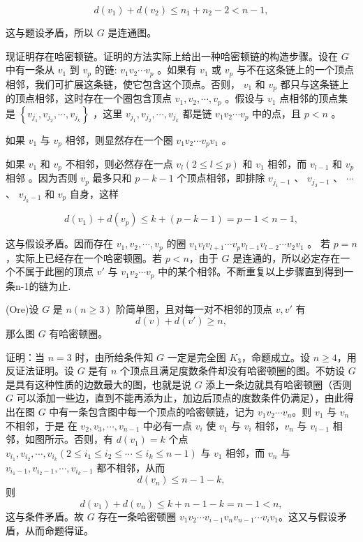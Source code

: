 \documentclass{article}
\begin{document}
\[ d\left(v_{1}\right) + d\left(v_{2}\right) \leqslant n_{1} + n_{2} - 2 < n - 1, \]

这与题设矛盾，所以 $G$ 是连通图。

现证明存在哈密顿链。证明的方法实际上给出一种哈密顿链的构造步骤。设在 $G$ 中有一条从 $v_{1}$ 到 $v_{p}$ 的链: $v_{1} v_{2} \cdots v_{p}$ 。如果有 $v_{1}$ 或 $v_{p}$ 与不在这条链上的一个顶点相邻，我们可扩展这条链，使它包含这个顶点。否则， $v_{1}$ 和 $v_{p}$ 都只与这条链上的顶点相邻，这时存在一个圈包含顶点 $v_{1}, v_{2}, \cdots, v_{p}$ 。假设与 $v_{1}$ 点相邻的顶点集是 $\left\{ v_{j_{1}}, v_{j_{2}}, \cdots, v_{j_{k}} \right\}$ ，这里 $v_{j_{1}}, v_{j_{2}}, \cdots, v_{j_{k}}$ 都是链 $v_{1} v_{2} \cdots v_{p}$ 中的点，且 $p < n$ 。

如果 $v_{1}$ 与 $v_{p}$ 相邻，则显然存在一个圈 $v_{1} v_{2} \cdots v_{p} v_{1}$ 。

如果 $v_{1}$ 和 $v_{p}$ 不相邻，则必然存在一点 $v_{l} (2 \leqslant l \leqslant p)$ 和 $v_{1}$ 相邻，而 $v_{l-1}$ 和 $v_{p}$ 相邻 。因为否则 $v_{p}$ 最多只和 $p - k - 1$ 个顶点相邻，即排除 $v_{j_{1}-1}$ 、 $v_{j_{2}-1}$ 、 $\cdots$ 、 $v_{j_{k}-1}$ 和 $v_{p}$ 自身，这样

\[ d\left(v_{1}\right) + d\left(v_{p}\right) \leqslant k + (p - k - 1) = p - 1 < n - 1, \]

这与假设矛盾。因而存在 $v_{1}, v_{2}, \cdots, v_{p}$ 的圈 $v_{1} v_{l} v_{l+1} \cdots v_{p} v_{l-1} v_{l-2} \cdots v_{2} v_{1}$ 。
若 $p = n$，实际上已经存在一个哈密顿圈。若 $p < n$，由于 $G$ 是连通的，所以必定存在一个不属于此圈的顶点 $v'$ 与 $v_1 v_2 \cdots v_p$ 中的某个相邻。不断重复以上步骤直到得到一条n-1的链为止.

(Ore)设 $G$ 是 $n(n \geqslant 3)$ 阶简单图，且对每一对不相邻的顶点 $v, v'$ 有
\[ d(v) + d(v') \geqslant n, \]
那么图 $G$ 有哈密顿圈。

证明：当 $n = 3$ 时，由所给条件知 $G$ 一定是完全图 $K_3$，命题成立。设 $n \geqslant 4$，用反证法证明。设 $G$ 是有 $n$ 个顶点且满足度数条件却没有哈密顿圈的图。不妨设 $G$ 是具有这种性质的边数最大的图，也就是说 $G$ 添上一条边就具有哈密顿圈（否则 $G$ 可以添加一些边，直到不能再添为止，加边后顶点的度数条件仍满足），由此得出在图 $G$ 中有一条包含图中每一个顶点的哈密顿链，记为 $v_1 v_2 \cdots v_n$。则 $v_1$ 与 $v_n$ 不相邻，于是
在 $v_2, v_3, \cdots, v_{n-1}$ 中必有一点 $v_i$ 使 $v_1$ 与 $v_i$ 相邻，$v_n$ 与 $v_{i-1}$ 相邻，如图所示。否则，有 $d(v_1) = k$ 个点 $v_{i_1}, v_{i_2}, \cdots, v_{i_k} \left(2 \leqslant i_1 \leqslant i_2 \leqslant \cdots \leqslant i_k \leqslant n-1\right)$ 与 $v_1$ 相邻，而 $v_n$ 与 $v_{i_1-1}, v_{i_2-1}, \cdots, v_{i_k-1}$ 都不相邻，从而
\[ d(v_n) \leqslant n-1-k, \]
则
\[ d(v_1) + d(v_n) \leqslant k + n - 1 - k = n - 1 < n, \]
这与条件矛盾。故 $G$ 存在一条哈密顿圈 $v_1 v_2 \cdots v_{i-1} v_n v_{n-1} \cdots v_i v_1$。这又与假设矛盾，从而命题得证。
\end{document}
